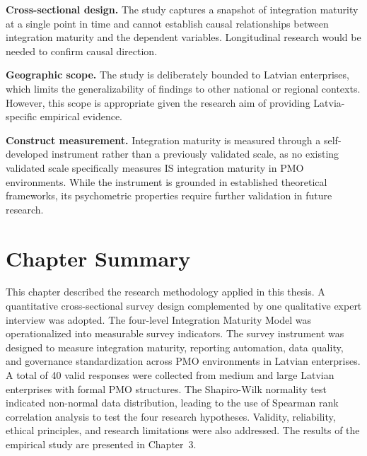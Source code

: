 \textbf{Cross-sectional design.} The study captures a snapshot of integration
maturity at a single point in time and cannot establish causal relationships
between integration maturity and the dependent variables. Longitudinal
research would be needed to confirm causal direction.

\textbf{Geographic scope.} The study is deliberately bounded to Latvian
enterprises, which limits the generalizability of findings to other national
or regional contexts. However, this scope is appropriate given the research
aim of providing Latvia-specific empirical evidence.

\textbf{Construct measurement.} Integration maturity is measured through
a self-developed instrument rather than a previously validated scale, as no
existing validated scale specifically measures IS integration maturity in
PMO environments. While the instrument is grounded in established theoretical
frameworks, its psychometric properties require further validation in
future research.

\section{Chapter Summary}
\label{sec:chap2summary}

This chapter described the research methodology applied in this thesis.
A quantitative cross-sectional survey design complemented by one qualitative
expert interview was adopted. The four-level Integration Maturity Model was
operationalized into measurable survey indicators. The survey instrument was
designed to measure integration maturity, reporting automation, data quality,
and governance standardization across PMO environments in Latvian enterprises.
A total of 40 valid responses were collected from medium and large Latvian
enterprises with formal PMO structures. The Shapiro-Wilk normality test
indicated non-normal data distribution, leading to the use of Spearman rank
correlation analysis to test the four research hypotheses. Validity, reliability,
ethical principles, and research limitations were also addressed. The results
of the empirical study are presented in Chapter~3.
